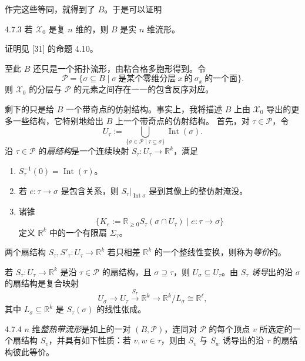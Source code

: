 作完这些等同，就得到了 $B$。于是可以证明

\begin{lemma}{4.7.3}
若 $\mathcal{X}_0$ 是复 $n$ 维的，则 $B$ 是实 $n$ 维流形。
\end{lemma}

证明见 [31] 的命题 4.10。

至此 $B$ 还只是一个拓扑流形，由粘合格多胞形得到。令
\[
\mathcal{P}=\{\sigma\subseteq B\mid \sigma\ \text{是某个零维分层}\ x\ \text{的}\ \sigma_x\ \text{的一个面}\}.
\]
则 $\mathcal{X}_0$ 的分层与 $\mathcal{P}$ 的元素之间存在一一的包含反序对应。

剩下的只是给 $B$ 一个带奇点的仿射结构。事实上，我将描述 $B$ 上由 $\mathcal{X}_0$ 导出的更多一些结构，它特别地给出 $B$ 上一个带奇点的仿射结构。
首先，对 $\tau\in\mathcal{P}$，令
\[
U_\tau:=\bigcup_{\{\sigma\in\mathcal{P}\mid \tau\subseteq\sigma\}}\operatorname{Int}(\sigma).
\]
沿 $\tau\in\mathcal{P}$ 的\emph{扇结构}是一个连续映射 $S_\tau:U_\tau\to\mathbb{R}^k$，满足
\begin{enumerate}
\item $S_\tau^{-1}(0)=\operatorname{Int}(\tau)$。
\item 若 $e:\tau\to\sigma$ 是包含关系，则 $S_\tau|_{\operatorname{Int}\sigma}$ 是到其像上的整仿射淹没。
\item 诸锥
\[
\{K_e:=\mathbb{R}_{\ge 0}S_\tau(\sigma\cap U_\tau)\mid e:\tau\to\sigma\}
\]
定义 $\mathbb{R}^k$ 中的一个有限扇 $\Sigma_\tau$。
\end{enumerate}
两个扇结构 $S_\tau,S'_\tau:U_\tau\to\mathbb{R}^k$ 若只相差 $\mathbb{R}^k$ 的一个整线性变换，则称为\emph{等价}的。

若 $S_\tau:U_\tau\to\mathbb{R}^k$ 是沿 $\tau\in\mathcal{P}$ 的扇结构，且 $\sigma\supseteq\tau$，则 $U_\sigma\subseteq U_\tau$。由 $S_\tau$ \emph{诱导}出的沿 $\sigma$ 的扇结构是复合映射
\[
U_\sigma\longrightarrow U_\tau\xrightarrow{S_\tau}\mathbb{R}^k\longrightarrow\mathbb{R}^k/L_\sigma\cong\mathbb{R}^\ell,
\]
其中 $L_\sigma\subseteq\mathbb{R}^k$ 是 $S_\tau(\sigma)$ 的线性张成。

\begin{definition}{4.7.4}
$n$ 维\emph{整热带流形}是如上的一对 $(B,\mathcal{P})$，连同对 $\mathcal{P}$ 的每个顶点 $v$ 所选定的一个扇结构 $S_v$，并具有如下性质：若 $v,w\in\tau$，则由 $S_v$ 与 $S_w$ 诱导出的沿 $\tau$ 的扇结构彼此等价。
\end{definition}

